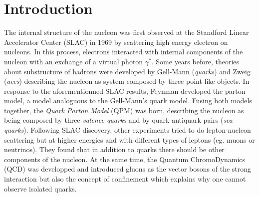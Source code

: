 
\chapter*{Introduction} %

\label{ch:intro} %


The internal structure of the nucleon was first observed at the Standford Linear Accelerator Center (SLAC) in 1969 by scattering high energy electron on nucleons. In this process, electrons interacted with internal components of the nucleon with an exchange of a virtual photon $\gamma^*$. Some years before, theories about substructure of hadrons were developed by Gell-Mann (\textit{quarks}) and Zweig (\textit{aces}) describing the nucleon as system composed by three point-like objects. In response to the aforementionned SLAC results, Feynman developed the parton model, a model analoguous to the Gell-Mann's quark model. Fusing both models together, the \textit{Quark Parton Model} (QPM) was born, describing the nucleon as being composed by three \textit{valence quarks} and by quark-antiquark pairs (\textit{sea quarks}). Following SLAC discovery, other experiments tried to do lepton-nucleon scattering but at higher energies and with different types of leptons (eg. muons or neutrinos). They found that in addition to quarks there should be other components of the nucleon. At the same time, the Quantum ChromoDynamics (QCD) was developped and introduced gluons as the vector bosons of the strong interaction but also the concept of confinement which explains why one cannot observe isolated quarks.

